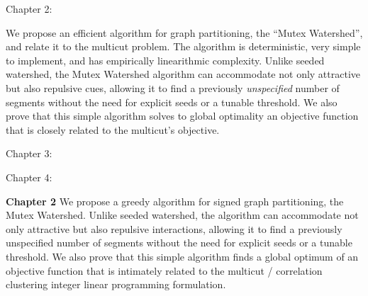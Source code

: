 \begin{paracol}{2}
\begin{leftcolumn*}
\noindent  Chapter 2:
\end{leftcolumn*}
\begin{rightcolumn}
\noindent We propose an efficient algorithm for graph partitioning, the ``Mutex Watershed'', and relate it to the multicut problem. 
The algorithm is deterministic, very simple to implement, and has empirically linearithmic complexity. 
Unlike seeded watershed, the Mutex Watershed algorithm can accommodate not only attractive but also repulsive cues, allowing it to find a previously \emph{unspecified} number of segments without the need for explicit seeds or a tunable threshold. We also prove that this simple algorithm solves to global optimality an objective function that is closely related to the multicut's objective. 
\end{rightcolumn}
\medskip
\begin{leftcolumn*}
\noindent  Chapter 3:
\end{leftcolumn*}
\begin{rightcolumn}
\end{rightcolumn}
\medskip
\begin{leftcolumn*}
\noindent  Chapter 4:
\end{leftcolumn*}
\begin{rightcolumn}
\end{rightcolumn}
\end{paracol}

\textbf{Chapter 2}
We propose a greedy algorithm for signed graph partitioning, the Mutex Watershed. Unlike seeded watershed, the algorithm can accommodate not only attractive but also repulsive interactions, allowing it to ﬁnd a previously unspeciﬁed number of segments without the need for explicit seeds or a tunable threshold. We also prove that this simple algorithm ﬁnds a global optimum of an objective function that is intimately related to the multicut / correlation clustering integer linear programming formulation.



